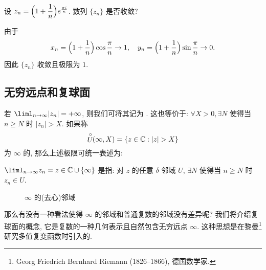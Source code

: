\begin{example}
  设 $z_n=\Bigl(1+\dfrac1n\Bigr)e^{\frac{\pi i}n}$. 数列 $\{z_n\}$ 是否收敛?
\end{example}

\begin{solution}
  由于
  \[
    x_n=\Bigl(1+\frac1n\Bigr)\cos\frac\pi n\to 1,\quad
    y_n=\Bigl(1+\frac1n\Bigr)\sin\frac\pi n\to 0.
  \]
  因此 $\{z_n\}$ 收敛且极限为 $1$.
\end{solution}


\subsection{无穷远点和复球面}


若 $\liml_{n\to\infty}|z_n|=+\infty$, 则我们可将其记为 .
这也等价于: $\forall X>0,\exists N$ 使得当 $n\ge N$ 时 $|z_n|>X$.
如果称
\[
  \Uc(\infty,X)=\{z\in\BC:|z|>X\}
\]
为 $\infty$ 的,
那么上述极限可统一表述为:

\begin{definition}
  $\liml_{n\to\infty}z_n=z\in\BC\cup\set\infty$ 是指: 对 $z$ 的任意 $\delta$ 邻域 $U$, $\exists N$ 使得当 $n\ge N$ 时 $z_n\in U$.\footnotemark
\end{definition}


\begin{figure}[!ht]
  \centering
  \caption{$\infty$ 的(去心)邻域}
\end{figure}

那么有没有一种看法使得 $\infty$ 的邻域和普通复数的邻域没有差异呢?
我们将介绍复球面的概念, 它是复数的一种几何表示且自然包含无穷远点 $\infty$.
这种思想是在黎曼\footnote{
  Georg Friedrich Bernhard Riemann (1826--1866), 德国数学家.
}研究多值复变函数时引入的.

